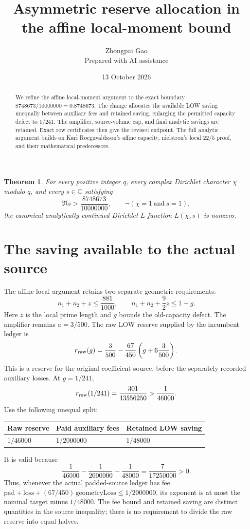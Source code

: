 \documentclass[10pt]{article}
\title{Asymmetric reserve allocation in the affine local-moment bound}
\author{Zhongpai Gao\\\small Prepared with AI assistance}
\date{13 October 2026}
\newtheorem{theorem}{Theorem}
\newcommand{\C}{\mathbb C}
\begin{document}
\maketitle
\begin{abstract}
We refine the affine local-moment argument to the exact boundary
$8748673/10000000=0.8748673$. The change allocates the available LOW saving
unequally between auxiliary fees and retained saving, enlarging the permitted
capacity defect to $1/241$. The amplifier, source-volume cap, and final
analytic savings are retained. Exact row certificates then give the revised
endpoint. The full analytic argument builds on Kari Roegnvaldsson's affine
capacity, nielstron's local $22/5$ proof, and their mathematical predecessors.
\end{abstract}

\begin{theorem}\label{thm:main}
For every positive integer $q$, every complex Dirichlet character $\chi$
modulo $q$, and every $s\in\C$ satisfying
\[
 \Re s>\frac{8748673}{10000000},\qquad
 \neg(\chi=1\ \text{and}\ s=1),
\]
the canonical analytically continued Dirichlet $L$-function $L(\chi,s)$ is nonzero.
\end{theorem}

\section{The saving available to the actual source}
The affine local argument retains two separate geometric requirements:
\[
 n_1+n_2+z\le\frac{881}{1000},\qquad
 n_1+n_2+\frac92z\le1+g.
\]
Here $z$ is the local prime length and $g$ bounds the old-capacity defect.
The amplifier remains $a=3/500$. The raw LOW reserve supplied by the
incumbent ledger is
\[
 r_{\rm raw}(g)=\frac3{500}-\frac{67}{450}
                  \left(g+6\frac3{500}\right).
\]
This is a reserve for the original coefficient source, before the separately
recorded auxiliary losses. At $g=1/241$,
\[
 r_{\rm raw}(1/241)=\frac{301}{13556250}>\frac1{46000}.
\]
Use the following unequal split:
\begin{center}
\begin{tabular}{lll}
\toprule
Raw reserve & Paid auxiliary fees & Retained LOW saving\\
\midrule
$1/46000$ & $1/2000000$ & $1/48000$\\
\bottomrule
\end{tabular}
\end{center}
It is valid because
\[
 \frac1{46000}-\frac1{2000000}-\frac1{48000}
 =\frac7{17250000}>0.
\]
Thus, whenever the actual padded-source ledger has fee
$\mathrm{pad}+\mathrm{loss}+(67/450)\,\mathrm{geometryLoss}\le1/2000000$,
its exponent is at most the nominal target minus $1/48000$.
The fee bound and retained saving are distinct quantities in the source
inequality; there is no requirement to divide the raw reserve into equal halves.
\end{document}
